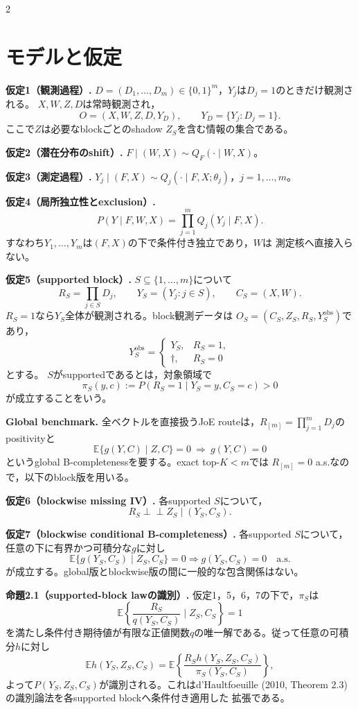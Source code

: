 \documentclass[a4paper,10pt]{article}
\newcommand{\E}{\mathbb E}
\newcommand{\indep}{\mathrel{\perp\!\!\!\perp}}
\begin{document}
\begin{multicols}{2}
\section{モデルと仮定}
\noindent\textbf{仮定1（観測過程）.}
$D=(D_1,\ldots,D_m)\in\{0,1\}^m$，$Y_j$は$D_j=1$のときだけ観測される。
$X,W,Z,D$は常時観測され，
\[
O=(X,W,Z,D,Y_D),\qquad Y_D=\{Y_j:D_j=1\}.
\]
ここで$Z$は必要なblockごとのshadow $Z_S$を含む情報の集合である。

\noindent\textbf{仮定2（潜在分布のshift）.}
$F\mid(W,X)\sim Q_F(\cdot\mid W,X)$。

\noindent\textbf{仮定3（測定過程）.}
$Y_j\mid(F,X)\sim Q_j(\cdot\mid F,X;\theta_j)$，$j=1,\ldots,m$。

\noindent\textbf{仮定4（局所独立性とexclusion）.}
\[
P(Y\mid F,W,X)=\prod_{j=1}^m Q_j(Y_j\mid F,X).
\]
すなわち$Y_1,\ldots,Y_m$は$(F,X)$の下で条件付き独立であり，$W$は
測定核へ直接入らない。

\noindent\textbf{仮定5（supported block）.}
$S\subseteq\{1,\ldots,m\}$について
\[
R_S=\prod_{j\in S}D_j,\qquad Y_S=(Y_j:j\in S),\qquad C_S=(X,W).
\]
$R_S=1$なら$Y_S$全体が観測される。block観測データは
$O_S=(C_S,Z_S,R_S,Y_S^{\mathrm{obs}})$であり，
\[
Y_S^{\mathrm{obs}}=
\begin{cases}Y_S,&R_S=1,\\ \dagger,&R_S=0\end{cases}
\]
とする。
$S$がsupportedであるとは，対象領域で
\[
\pi_S(y,c):=P(R_S=1\mid Y_S=y,C_S=c)>0
\]
が成立することをいう。

\noindent\textbf{Global benchmark.}
全ベクトルを直接扱うJoE routeは，$R_{[m]}=\prod_{j=1}^mD_j$の
positivityと
\[
\E\{g(Y,C)\mid Z,C\}=0\ \Longrightarrow\ g(Y,C)=0
\]
というglobal B-completenessを要する。exact top-$K<m$では
$R_{[m]}=0$ a.s.なので，以下のblock版を用いる。

\noindent\textbf{仮定6（blockwise missing IV）.}
各supported $S$について，
\[
R_S\indep Z_S\mid(Y_S,C_S).
\]

\noindent\textbf{仮定7（blockwise conditional B-completeness）.}
各supported $S$について，任意の下に有界かつ可積分な$g$に対し
\[
\E\{g(Y_S,C_S)\mid Z_S,C_S\}=0
\Longrightarrow g(Y_S,C_S)=0\quad\text{a.s.}
\]
が成立する。global版とblockwise版の間に一般的な包含関係はない。

\noindent\textbf{命題2.1（supported-block lawの識別）.}
仮定1，5，6，7の下で，$\pi_S$は
\begin{equation}
\E\left\{\frac{R_S}{q(Y_S,C_S)}\mid Z_S,C_S\right\}=1
\end{equation}
を満たし条件付き期待値が有限な正値関数$q$の唯一解である。従って任意の可積分$h$に対し
\begin{equation}
\E h(Y_S,Z_S,C_S)
=\E\left\{\frac{R_Sh(Y_S,Z_S,C_S)}{\pi_S(Y_S,C_S)}\right\},
\end{equation}
よって$P(Y_S,Z_S,C_S)$が識別される。これはd'Haultfoeuille
(2010, Theorem 2.3)の識別論法を各supported blockへ条件付き適用した
拡張である。


\end{multicols}
\end{document}
